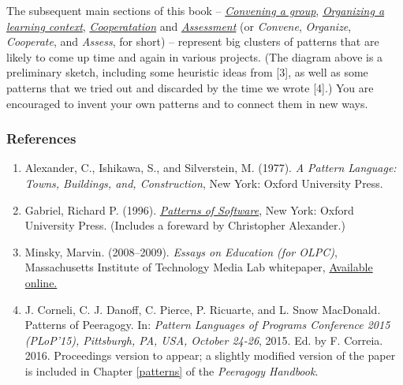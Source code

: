 The subsequent main sections of this book --
\href{http://peeragogy.org/convene/}{\emph{Convening a group}},
\href{http://peeragogy.org/organize/}{\emph{Organizing a learning
    context}},
\href{http://peeragogy.org/facilitate/}{\emph{Cooperatation}} and
\href{http://peeragogy.org/assessment/}{\emph{Assessment}} (or
\emph{Convene}, \emph{Organize}, \emph{Cooperate}, and \emph{Assess},
for short) -- represent big clusters of patterns that are likely to
come up time and again in various projects. (The diagram above is
a preliminary sketch, including some heuristic ideas from {[}3{]},
as well as some patterns that we tried out and discarded
by the time we wrote {[}4{]}.)
You are encouraged to invent your own patterns and to connect
them in new ways. 

\subsubsection{References}\label{references}

\begin{enumerate}
\def\labelenumi{\arabic{enumi}.}
\item
  Alexander, C., Ishikawa, S., and Silverstein, M. (1977). \emph{A
  Pattern Language: Towns, Buildings, and, Construction}, New York:
  Oxford University Press.
\item
  Gabriel, Richard P. (1996).
  \emph{\href{http://dreamsongs.net/Files/PatternsOfSoftware.pdf}{Patterns
  of Software}}, New York: Oxford University Press. (Includes a foreward
  by Christopher Alexander.)
\item
  Minsky, Marvin. (2008--2009). \emph{Essays on Education (for
  {O}{L}{P}{C})}, Massachusetts Institute of Technology Media Lab
  whitepaper,
  \href{http://web.media.mit.edu/~minsky/OLPC-1.html}{Available online.}
\item J. Corneli, C. J. Danoff, C. Pierce, P. Ricuarte, and L. Snow
MacDonald. Patterns of Peeragogy. In: \emph{Pattern Languages of Programs
Conference 2015 (PLoP’15), Pittsburgh, PA, USA, October 24-26}, 2015.
Ed. by F. Correia. 2016. Proceedings version to appear; a slightly
modified version of the paper is included in Chapter \ref{patterns} of the
\emph{Peeragogy Handbook}.
\end{enumerate}
